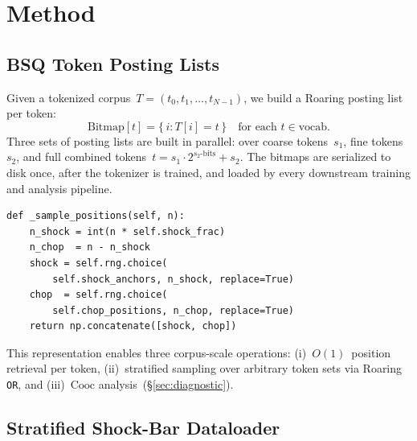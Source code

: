 \documentclass[10pt]{article}
\begin{document}
\section{Method}\label{sec:method}

\subsection{BSQ Token Posting Lists}\label{sec:posting-lists}

Given a tokenized corpus~$T = (t_0, t_1, \ldots, t_{N-1})$, we build
a Roaring posting list per token:
\begin{equation}
\mathrm{Bitmap}[t] = \{\, i : T[i] = t \,\}\quad \text{for each $t \in
\mathrm{vocab}$}.
\end{equation}
Three sets of posting lists are built in parallel: over coarse
tokens~$s_1$, fine tokens~$s_2$, and full combined
tokens~$t = s_1 \cdot 2^{s_2\text{-bits}} + s_2$. The bitmaps are
serialized to disk once, after the tokenizer is trained, and loaded
by every downstream training and analysis pipeline.

\begin{lstlisting}[caption={Roaring stratified shock-bar sampling.
The bitmap \texttt{rare\_union} is the Roaring \texttt{OR} of all
shock-token posting lists, built once at initialization. Each call
costs a single \texttt{np.random.choice} plus a
concatenate.}, label={lst:dataloader}, float]
def _sample_positions(self, n):
    n_shock = int(n * self.shock_frac)
    n_chop  = n - n_shock
    shock = self.rng.choice(
        self.shock_anchors, n_shock, replace=True)
    chop  = self.rng.choice(
        self.chop_positions, n_chop, replace=True)
    return np.concatenate([shock, chop])
\end{lstlisting}

This representation enables three corpus-scale operations:
(i)~$O(1)$~position retrieval per token, (ii)~stratified sampling
over arbitrary token sets via Roaring \texttt{OR}, and (iii)~$\mathrm{Cooc}$
analysis~(\S\ref{sec:diagnostic}).

\subsection{Stratified Shock-Bar Dataloader}\label{sec:dataloader}
\end{document}
